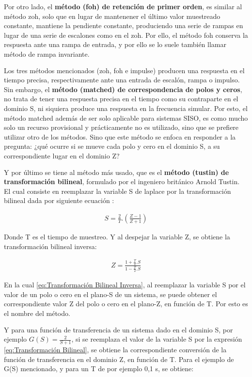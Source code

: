 \documentclass{article}
\begin{document}
\begin{sloppypar}
Por otro lado, el \textbf{método (foh) de retención de primer orden}, es similar al método zoh, solo que en lugar de mantenener el último valor muestreado constante, mantiene la pendiente constante, produciendo una serie de rampas en lugar de una serie de escalones como en el zoh. Por ello, el método foh conserva la respuesta ante una rampa de entrada, y por ello se lo suele también llamar método de rampa invariante.

Los tres métodos mencionados (zoh, foh e impulse) producen una respuesta en el tiempo precisa, respectivamente ante una entrada de escalón, rampa o impulso. Sin embargo, el \textbf{método (matched) de correspondencia de polos y ceros}, no trata de tener una respuesta precisa en el tiempo como su contraparte en el dominio S, ni siquiera produce una respuesta en la frecuencia simular. Por esto, el método matched además de ser solo aplicable para sistemas SISO, es como mucho solo un recurso provisional y prácticamente no es utilizado, sino que se prefiere utilizar otro de los métodos. Sino que este método se enfoca en responder a la pregunta: ¿qué ocurre si se mueve cada polo y cero en el dominio S, a su correspondiente lugar en el dominio Z?

Y por último se tiene al método más usado, que es el \textbf{método (tustin) de transformación bilineal}, formulado por el ingeniero británico Arnold Tustin. El cual consiste en reemplazar la variable S de laplace por la transformación bilineal dada por siguiente ecuación :

\begin{align}   \label{eq:Transformación Bilineal}
    S=\frac{2}{T}.\left(\frac{Z-1}{Z+1}\right)
\end{align}

Donde T es el tiempo de muestreo. Y al despejar la variable Z, se obtiene la transformación bilineal inversa:

\begin{align}   \label{eq:Transformación Bilineal Inversa}
    Z=\frac{1+\frac{T}{2}.S}{1-\frac{T}{2}.S}
\end{align}

En la cual \ref{eq:Transformación Bilineal Inversa}, al reemplazar la variable S por el valor de un polo o cero en el plano-S de un sistema, se puede obtener el correspondiente valor Z del polo o cero en el plano-Z, en función de T. Por esto es el nombre del método.

Y para una función de transferencia de un sistema dado en el dominio S, por ejemplo $G(S)=\frac{2}{S+1}$, si se reemplaza el valor de la variable S por la expresión \ref{eq:Transformación Bilineal}, se obtiene la correspondiente conversión de la función de transferencia en el dominio Z, en función de T. Para el ejemplo de G(S) mencionado, y para un T de por ejemplo 0,1 s, se obtiene:


\end{sloppypar}
\end{document}
